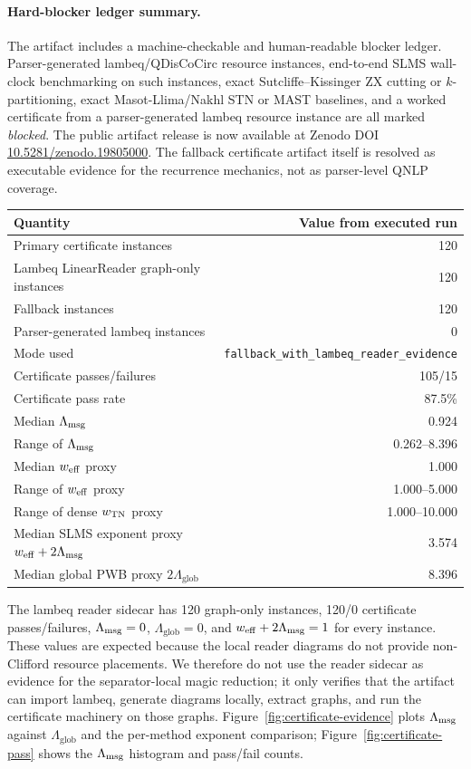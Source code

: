 \paragraph{Hard-blocker ledger summary.}
The artifact includes a machine-checkable and human-readable blocker ledger. Parser-generated lambeq/QDisCoCirc resource instances, end-to-end SLMS wall-clock benchmarking on such instances, exact Sutcliffe--Kissinger ZX cutting or \(k\)-partitioning, exact Masot-Llima/Nakhl STN or MAST baselines, and a worked certificate from a parser-generated lambeq resource instance are all marked \emph{blocked}. The public artifact release is now available at Zenodo DOI \href{https://doi.org/10.5281/zenodo.19805000}{10.5281/zenodo.19805000}. The fallback certificate artifact itself is resolved as executable evidence for the recurrence mechanics, not as parser-level QNLP coverage.

\begin{center}
\small
\begin{tabular}{lr}
\toprule
Quantity & Value from executed run \\
\midrule
Primary certificate instances & 120 \\
Lambeq LinearReader graph-only instances & 120 \\
Fallback instances & 120 \\
Parser-generated lambeq instances & 0 \\
Mode used & \texttt{fallback\_with\_lambeq\_reader\_evidence} \\
Certificate passes/failures & 105/15 \\
Certificate pass rate & 87.5\% \\
Median \(\Lambda_{\mathrm{msg}}\) & 0.924 \\
Range of \(\Lambda_{\mathrm{msg}}\) & 0.262--8.396 \\
Median \(w_{\mathrm{eff}}\) proxy & 1.000 \\
Range of \(w_{\mathrm{eff}}\) proxy & 1.000--5.000 \\
Range of dense \(w_{\mathrm{TN}}\) proxy & 1.000--10.000 \\
Median SLMS exponent proxy \(w_{\mathrm{eff}}+2\Lambda_{\mathrm{msg}}\) & 3.574 \\
Median global PWB proxy \(2\Lambda_{\mathrm{glob}}\) & 8.396 \\
\bottomrule
\end{tabular}
\end{center}

The lambeq reader sidecar has 120 graph-only instances, 120/0 certificate passes/failures, \(\Lambda_{\mathrm{msg}}=0\), \(\Lambda_{\mathrm{glob}}=0\), and \(w_{\mathrm{eff}}+2\Lambda_{\mathrm{msg}}=1\) for every instance. These values are expected because the local reader diagrams do not provide non-Clifford resource placements. We therefore do not use the reader sidecar as evidence for the separator-local magic reduction; it only verifies that the artifact can import lambeq, generate diagrams locally, extract graphs, and run the certificate machinery on those graphs. Figure~\ref{fig:certificate-evidence} plots \(\Lambda_{\mathrm{msg}}\) against \(\Lambda_{\mathrm{glob}}\) and the per-method exponent comparison; Figure~\ref{fig:certificate-pass} shows the \(\Lambda_{\mathrm{msg}}\) histogram and pass/fail counts.

